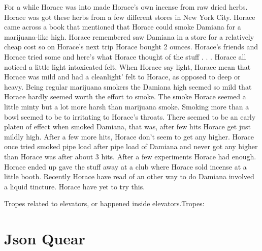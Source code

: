\documentclass[12pt]{book}
\begin{document}
For a while Horace was into made Horace's own incense from raw dried herbs. Horace was got these herbs from a few different stores in New York City. Horace came across a book that mentioned that Horace could smoke Damiana for a marijuana-like high. Horace remembered saw Damiana in a store for a relatively cheap cost so on Horace's next trip Horace bought 2 ounces. Horace's friends and Horace tried some and here's what Horace thought of the stuff . . .  Horace all noticed a little light intoxicated felt. When Horace say light, Horace mean that Horace was mild and had a cleanlight' felt to Horace, as opposed to deep or heavy. Being regular marijuana smokers the Damiana high seemed so mild that Horace hardly seemed worth the effort to smoke. The smoke Horace seemed a little minty but a lot more harsh than marijuana smoke. Smoking more than a bowl seemed to be to irritating to Horace's throats. There seemed to be an early plateu of effect when smoked Damiana, that was, after few hits Horace get just mildly high. After a few more hits, Horace don't seem to get any higher. Horace once tried smoked pipe load after pipe load of Damiana and never got any higher than Horace was after about 3 hits. After a few experiments Horace had enough. Horace ended up gave the stuff away at a club where Horace sold incense at a little booth. Recently Horace have read of an other way to do Damiana involved a liquid tincture. Horace have yet to try this.



Tropes related to elevators, or happened inside elevators.Tropes:



\chapter{Json Quear}
\end{document}
